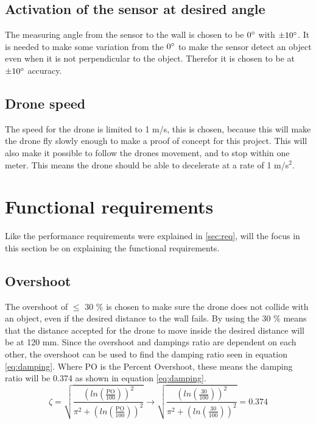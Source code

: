 \subsection*{Activation of the sensor at desired angle}
The measuring angle from the sensor to the wall is chosen to be $0\degree$ with $\pm 10 \degree$. It is needed to make some variation from the $0\degree$ to make the sensor detect an object even when it is not perpendicular to the object. Therefor it is chosen to be at $\pm 10 \degree$ accuracy.

\subsection*{Drone speed}
The speed for the drone is limited to 1 m/s, this is chosen, because this will make the drone fly slowly enough to make a proof of concept for this project. This will also make it possible to follow the drones movement, and to stop within one meter. This means the drone should be able to decelerate at a rate of 1 m/s$^2$.


\section{Functional requirements}
Like the performance requirements were explained in \ref{sec:req}, will the focus in this section be on explaining the functional requirements.

\subsection*{Overshoot}
The overshoot of $\leq$ 30 \% is chosen to make sure the drone does not collide with an object, even if the desired distance to the wall fails. By using the 30 \% means that the distance accepted for the drone to move inside the desired distance will be at 120 mm. 
Since the overshoot and dampings ratio are dependent on each other, the overshoot can be used to find the damping ratio seen in equation \ref{eq:damping}. Where PO is the Percent Overshoot, these means the damping ratio will be 0.374 as shown in equation \ref{eq:damping}.
\begin{equation}\label{eq:damping}
   \zeta = \sqrt{\frac{(ln(\frac{\text{PO}}{100}))^{2}}{\pi^{2}+(ln(\frac{\text{PO}}{100}))^{2}}} \to \sqrt{\frac{(ln(\frac{\text{30}}{100}))^{2}}{\pi^{2}+(ln(\frac{\text{30}}{100}))^{2}}}=0.374
\end{equation}
